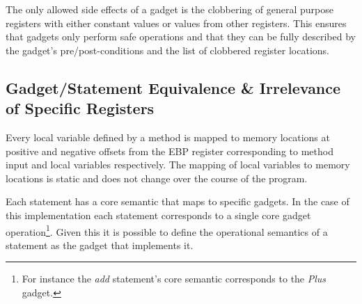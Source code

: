\documentclass[finalcopy,short]{srpaper}
\begin{document}
            The only allowed side effects of a gadget is the clobbering of
            general purpose registers with either constant values or values from
            other registers. This ensures that gadgets only perform safe
            operations and that they can be fully described by the gadget's
            pre/post-conditions and the list of clobbered register locations.


        \subsection{Gadget/Statement Equivalence \& Irrelevance of Specific Registers}

            Every local variable defined by a method is mapped to memory
            locations at positive and negative offsets from the EBP register
            corresponding to method input and local variables respectively. The
            mapping of local variables to memory locations is static and does
            not change over the course of the program.

            Each statement has a core semantic that maps to specific gadgets. In
            the case of this implementation each statement corresponds to a
            single core gadget operation\footnote{For instance the \emph{add}
            statement's core semantic corresponds to the \emph{Plus} gadget.}.
            Given this it is possible to define the operational semantics of a
            statement as the gadget that implements it.
\end{document}
